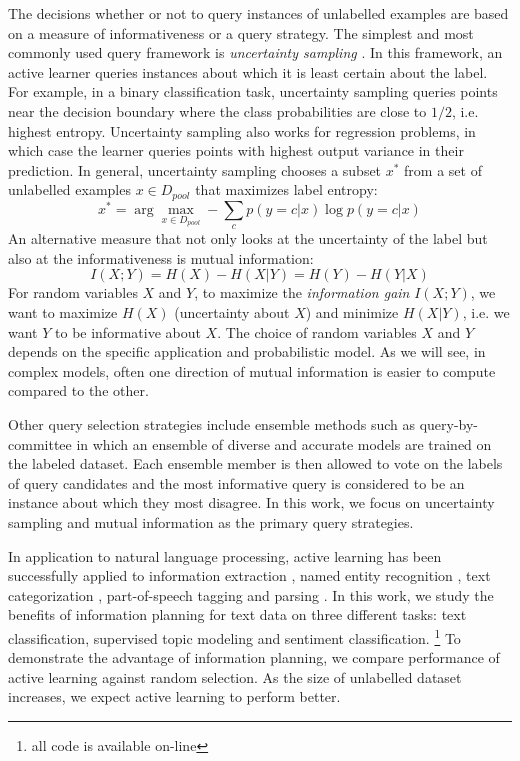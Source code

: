 The decisions whether or not to query instances of unlabelled examples are based on a measure of informativeness or a query strategy. The simplest and most commonly used query framework is \textit{uncertainty sampling} \cite{Lewis1994}. In this framework, an active learner queries instances about which it is least certain about the label. For example, in a binary classification task, uncertainty sampling queries points near the decision boundary where the class probabilities are close to $1/2$, i.e. highest entropy. Uncertainty sampling also works for regression problems, in which case the learner queries points with highest output variance in their prediction. In general, uncertainty sampling chooses a subset $x^{\ast}$ from a set of unlabelled examples $x \in D_{pool}$ that maximizes label entropy:
\begin{equation}
    x^{\ast} = \arg\max_{x\in D_{pool}} -\sum_c p(y=c|x)\log p(y=c|x)
\end{equation}
An alternative measure that not only looks at the uncertainty of the label but also at the informativeness is mutual information:
\begin{equation}
    I(X;Y) = H(X) - H(X|Y) = H(Y) - H(Y|X)
\end{equation}
For random variables $X$ and $Y$, to maximize the \textit{information gain} $I(X;Y)$, we want to maximize $H(X)$ (uncertainty about $X$) and minimize $H(X|Y)$, i.e. we want $Y$ to be informative about $X$. The choice of random variables $X$ and $Y$ depends on the specific application and probabilistic model. As we will see, in complex models, often one direction of mutual information is easier to compute compared to the other.  

Other query selection strategies include ensemble methods such as query-by-committee \cite{Seung1992} in which an ensemble of diverse and accurate models are trained on the labeled dataset. Each ensemble member is then allowed to vote on the labels of query candidates and the most informative query is considered to be an instance about which they most disagree. In this work, we focus on uncertainty sampling and mutual information as the primary query strategies.  

In application to natural language processing, active learning has been successfully applied to information extraction \cite{Scheffer2001}, named entity recognition \cite{Becker2005}, text categorization \cite{Tong2002}, part-of-speech tagging \cite{Ringger2007} and parsing \cite{Becker2005b}. In this work, we study the benefits of information planning for text data on three different tasks: text classification, supervised topic modeling and sentiment classification. \footnote{all code is available on-line} To demonstrate the advantage of information planning, we compare performance of active learning against random selection. As the size of unlabelled dataset increases, we expect active learning to perform better.

